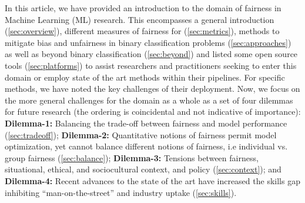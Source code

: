 \addtocounter{footnote}{-5}
\addtocounter{footnote}{1}
\addtocounter{footnote}{1}
\addtocounter{footnote}{1}
\addtocounter{footnote}{1}
\addtocounter{footnote}{1}
\addtocounter{footnote}{1}
\label{sec:challenges}

\label{sec:dilemmas}
In this article, we have provided an introduction to the domain of fairness in Machine Learning (ML) research. This encompasses a general introduction (\autoref{sec:overview}), different measures of fairness for \ml (\autoref{sec:metrics}), methods to mitigate bias and unfairness in binary classification problems (\autoref{sec:approaches}) as well as beyond binary classification (\autoref{sec:beyond}) and listed some open source tools (\autoref{sec:platforms}) to assist researchers and practitioners seeking to enter this domain or employ state of the art methods within their \ml pipelines. 
For specific methods, we have noted the key challenges of their deployment. Now, we focus on the more general challenges for the domain as a whole as a set of four dilemmas for future research (the ordering is coincidental and not indicative of importance): {\bf Dilemma-1:} Balancing the trade-off between fairness and model performance (\autoref{sec:tradeoff}); {\bf Dilemma-2:} Quantitative notions of fairness permit model optimization, yet cannot balance different notions of fairness, i.e individual vs. group fairness (\autoref{sec:balance}); {\bf Dilemma-3:} Tensions between fairness,  situational, ethical, and sociocultural context, and policy (\autoref{sec:context}); and {\bf Dilemma-4:} Recent advances to the state of the art have increased the skills gap inhibiting ``man-on-the-street'' and industry uptake (\autoref{sec:skills}).

